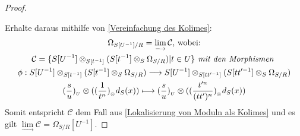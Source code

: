 \documentclass[10pt,a4paper]{report}
\newcommand{\functionfront}[3]{\nolinebreak{#1:#2 \longrightarrow #3}}
\newcommand{\divR}[2]{\Omega_{#1/#2}}
\newcommand{\Tensor}[3]{#1 \otimes_{#2} #3}
\newcommand{\tensor}[3]{#1 \otimes #3}
\newcommand{\lok}[2]{#1 [#2^{-1}]}
\newcommand{\loke}[3]{(\frac{#1}{#2})_{_#3}}
\newcommand{\colimes}[0]{\lim\limits_{ \longrightarrow }}
\begin{document}
\begin{proof}
\begin{center}
\end{center}
Erhalte daraus mithilfe von \cref{Vereinfachung des Kolimes}:
\begin{gather*}
\divR{\lok{S}{U}}{R}  = \colimes{\mathcal{C}} \text{, wobei:} \\
\mathcal{C} = \lbrace \Tensor{\lok{S}{U}}{\lok{S}{t}}{( \Tensor{\lok{S}{t}}{S}{\divR{S}{R}} )} \vert t \in U \rbrace \textit{ mit den Morphismen }\\
\functionfront{\phi}{\Tensor{\lok{S}{U}}{\lok{S}{t}}{( \Tensor{\lok{S}{t}}{S}{\divR{S}{R}} )}}{\Tensor{\lok{S}{U}}{\lok{S}{tt'}}{( \Tensor{\lok{S}{tt'}}{S}{\divR{S}{R}} )}} \\
\tensor{\loke{s}{u}{U}}{\lok{S}{t}}{( \tensor{\loke{1}{t^n}}{S}{d_{S}(x)} )} \longmapsto \tensor{\loke{s}{u}{U}}{\lok{S}{tt'}}{( \tensor{\loke{t'^n}{(tt')^n}}{S}{d_{S}(x)} )}
\end{gather*}
Somit entspricht $\mathcal{C}$ dem Fall aus \cref{Lokalisierung von Moduln als Kolimes} und es gilt $\colimes \mathcal{C} = \lok{\divR{S}{R}}{U}$.
\end{proof}
\end{document}
